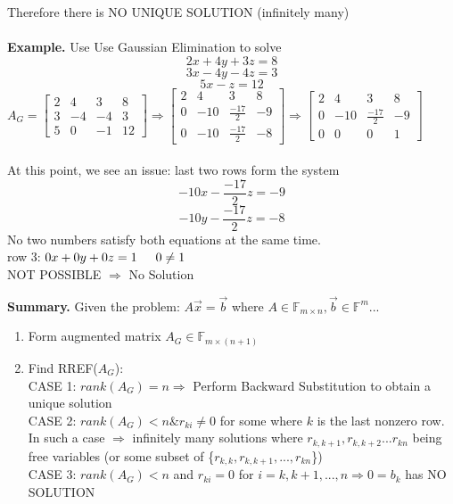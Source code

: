 \documentclass [12pt]{article}
\begin{document}
Therefore there is NO UNIQUE SOLUTION (infinitely many)\\\\
\noindent\textbf{Example. } Use Use Gaussian Elimination to solve
\[2x+4y+3z=8\]
\[3x-4y-4z=3\]
\[5x-z=12\]
$A_G=\begin{bmatrix}
2&4&3&8\\
3&-4&-4&3\\
5&0&-1&12
\end{bmatrix}\Rightarrow\begin{bmatrix}
2&4&3&8\\
0&-10&\frac{-17}{2}&-9\\
0&-10&\frac{-17}{2}&-8
\end{bmatrix}\Rightarrow\begin{bmatrix}
2&4&3&8\\
0&-10&\frac{-17}{2}&-9\\
0&0&0&1
\end{bmatrix}$\\\\
At this point, we see an issue: last two rows form the system 
\[-10x-\frac{-17}{2}z=-9\]
\[-10y-\frac{-17}{2}z=-8\]
No two numbers satisfy both equations at the same time.\\
row 3: $0x+0y+0z=1\indent 0\neq 1$\\ 
NOT POSSIBLE $\Rightarrow$ No Solution

\begin{framed}
\noindent\textbf{Summary. }Given the problem: $A\overrightarrow{x}=\overrightarrow{b}$ where $A\in\mathbb{F}_{m\times n},\overrightarrow{b}\in\mathbb{F}^m$...
\begin{enumerate}[\indent1.]
    \item Form augmented matrix $A_G\in\mathbb{F}_{m\times (n+1)}$
    \item Find RREF($A_G$):\\
    \indent CASE 1: $rank(A_G)=n\Rightarrow$ Perform Backward Substitution to obtain a unique solution \\
    \indent CASE 2: $rank(A_G)<n \& r_{ki}\neq 0$ for some where $k$ is the last nonzero row. In such a case $\Rightarrow$ infinitely many solutions where $r_{k,k+1},r_{k,k+2}...r_{kn}$ being free variables (or some subset of \{$r_{k,k},r_{k,k+1},...,r_{kn}$\})\\
    \indent CASE 3: $rank(A_G)<n$ and $r_{ki}=0$ for $i=k,k+1,...,n\Rightarrow0=b_k$ has NO SOLUTION
\end{enumerate}
\end{framed}
\pagebreak
\end{document}
